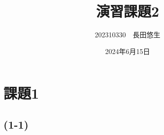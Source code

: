 \documentclass[uplatex, dvipdfmx, a4j, 11pt]{jarticle}
\title{演習課題2}
\author{202310330　長田悠生}
\date{2024年6月15日}
\begin{document}
\section*{課題1}
\subsection*{(1-1)}
\end{document}
